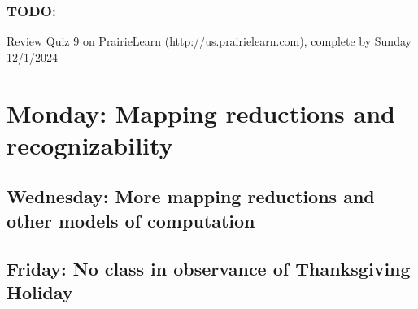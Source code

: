 \vspace{-20pt}

\subsubsection*{TODO:}
\begin{list}{\itemsep-10pt}
   \item Review Quiz 9 on PrairieLearn (http://us.prairielearn.com), complete by Sunday 12/1/2024
\end{list}

\newpage

\section*{Monday: Mapping reductions and recognizability}


    
\newpage
\subsection*{Wednesday: More mapping reductions and other models of computation}




\vfill
\subsection*{Friday: No class in observance of Thanksgiving Holiday}

